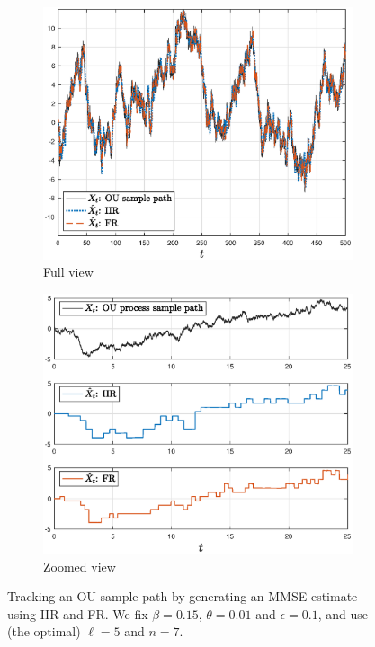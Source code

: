 \documentclass[12pt,journal,onecolumn]{IEEEtran}
\begin{document}
\begin{figure}[t]
\begin{subfigure}{.5\textwidth}
\center
\includegraphics[scale=.4]{tracking_theta_01_beta_15_eps_1_FULL}
\caption{Full view}
\label{fig_tracking_beta_15_theta_01_eps_1_FULL}
\end{subfigure}
\begin{subfigure}{.5\textwidth}
\center
\includegraphics[scale=.4]{tracking_theta_01_beta_15_eps_1_ZOOM}
\caption{Zoomed view}
\label{fig_tracking_beta_15_theta_01_eps_1_ZOOM}
\end{subfigure}
\caption{Tracking an OU sample path by generating an MMSE estimate using IIR and FR. We fix $\beta=0.15$, $\theta=0.01$ and $\epsilon=0.1$, and use (the optimal) $\ell=5$ and $n=7$.}
\label{fig_tracking_beta_15_theta_01_eps_1}
\end{figure}
\end{document}
